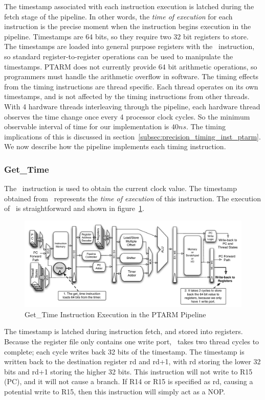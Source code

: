 The timestamp associated with each instruction execution is latched during the fetch stage of the pipeline.
In other words, the \emph{time of execution} for each instruction is the precise moment when the instruction begins execution in the pipeline.
Timestamps are 64 bits, so they require two 32 bit registers to store.
The timestamps are loaded into general purpose registers with the \gettime\ instruction, so standard register-to-register operations can be used to manipulate the timestamps. 
PTARM does not currently provide 64 bit arithmetic operations, so programmers must handle the arithmetic overflow in software.
The timing effects from the timing instructions are thread specific.   
Each thread operates on its own timestamps, and is not affected by the timing instructions from other threads.
With 4 hardware threads interleaving through the pipeline, each hardware thread observes the time change once every 4 processor clock cycles.
So the minimum observable interval of time for our implementation is $40 ns$. 
The timing implications of this is discussed in section~\ref{subsec:precision_timing_inst_ptarm}.
We now describe how the pipeline implements each timing instruction.  
	
\subsubsection{Get\_Time}    
The \gettime\ instruction is used to obtain the current clock value.
The timestamp obtained from \gettime\ represents the \emph{time of execution} of this instruction.
The execution of \gettime\ is straightforward and shown in figure~\ref{fig:get_time_pipeline_implementation}. 
\begin{figure}[h]
  
  \begin{center}
    \includegraphics[scale=.54]{figs/get_time_pipeline_implementation}
  \end{center}
  \vspace{-3mm}
  \caption{Get\_Time Instruction Execution in the PTARM Pipeline}
  \label{fig:get_time_pipeline_implementation}
\end{figure}
The timestamp is latched during instruction fetch, and stored into registers.
Because the register file only contains one write port, \gettime\ takes two thread cycles to complete; each cycle writes back 32 bits of the timestamp. 
The timestamp is written back to the destination register rd and rd+1, with rd storing the lower 32 bits and rd+1 storing the higher 32 bits. 
This instruction will not write to R15 (PC), and it will not cause a branch. 
If R14 or R15 is specified as rd, causing a potential write to R15, then this instruction will simply act as a NOP.

